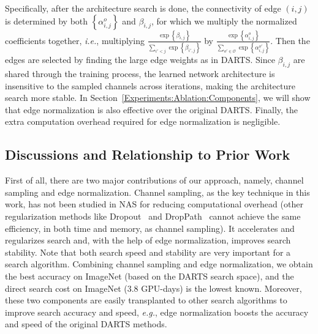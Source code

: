 \documentclass{article} \usepackage{iclr2020_conference,times}
\begin{document}
Specifically, after the architecture search is done, the connectivity of edge $\left(i,j\right)$ is determined by both $\left\{\alpha_{i,j}^o\right\}$ and $\beta_{i,j}$, for which we multiply the normalized coefficients together, \textit{i.e.}, multiplying $\frac{\exp\left\{\beta_{i,j}\right\}}{{\sum_{i'<j}}\exp\left\{\beta_{i',j}\right\}}$ by $\frac{\exp\left\{\alpha_{i,j}^o\right\}}{{\sum_{o'\in\mathcal{O}}}\exp\left\{\alpha_{i,j}^{o'}\right\}}$. Then the edges are selected by finding the large edge weights as in DARTS. Since $\beta_{i,j}$ are shared through the training process, the learned network architecture is insensitive to the sampled channels across iterations, making the architecture search more stable. 
In Section~\ref{Experiments:Ablation:Components}, we will show that edge normalization is also effective over the original DARTS. Finally, the extra computation overhead required for edge normalization is negligible.

\subsection{Discussions and Relationship to Prior Work}

First of all, there are two major contributions of our approach, namely, channel sampling and edge normalization. Channel sampling, as the key technique in this work, has not been studied in NAS for reducing computational overhead (other regularization methods like Dropout~\citep{srivastava2014dropout} and DropPath~\citep{larsson2016fractalnet} cannot achieve the same efficiency, in both time and memory, as channel sampling). It accelerates and regularizes search and, with the help of edge normalization, improves search stability. Note that both search speed and stability are very important for a search algorithm. Combining channel sampling and edge normalization, we obtain the best accuracy on ImageNet (based on the DARTS search space), and the direct search cost on ImageNet ($3.8$ GPU-days) is the lowest known. Moreover, these two components are easily transplanted to other search algorithms to improve search accuracy and speed, \textit{e.g.}, edge normalization boosts the accuracy and speed of the original DARTS methods.
\end{document}
